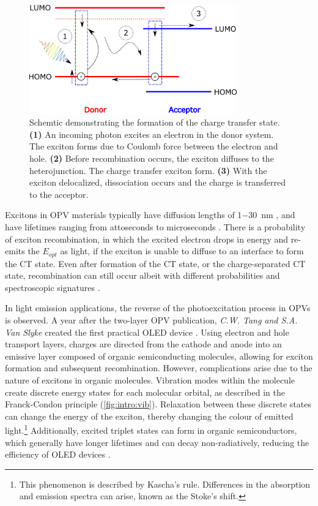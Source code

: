 \begin{figure}[h]
    \centering
    \includegraphics[width=0.8\textwidth]{pictures/CT_energy.png}
    \caption{Schemtic demonstrating the formation of the charge transfer state. \textbf{(1)} An incoming photon excites an electron in the donor system. The exciton forms due to Coulomb force between the electron and hole. \textbf{(2)} Before recombination occurs, the exciton diffuses to the heterojunction. The charge transfer exciton form. \textbf{(3)} With the exciton delocalized, dissociation occurs and the charge is transferred to the acceptor.}
    \label{fig:intro:ct}
\end{figure}

Excitons in \ac{OPV} materials typically have diffusion lengths of 1\SI{-30}{nm} \citep{proctor2013charge}, and have lifetimes ranging from attoseconds to microseconds \citep{tamai2015exciton}. There is a probability of exciton recombination, in which the excited electron drops in energy and re-emits the $E_{opt}$ as light, if the exciton is unable to diffuse to an interface to form the \ac{CT} state. Even after formation of the \ac{CT} state, or the charge-separated \ac{CT} state, recombination can still occur albeit with different probabilities and spectroscopic signatures \citep{deibel2010role}.

In light emission applications, the reverse of the photoexcitation process in \acp{OPV} is observed. A year after the two-layer \ac{OPV} publication, \emph{C.W. Tang and S.A. Van Slyke} created the first practical \ac{OLED} device \citep{Tang1987}. Using electron and hole transport layers, charges are directed from the cathode and anode into an emissive layer composed of organic semiconducting molecules, allowing for exciton formation and subsequent recombination. However, complications arise due to the nature of excitons in organic molecules. Vibration modes within the molecule create discrete energy states for each molecular orbital, as described in the Franck-Condon principle (\autoref{fig:intro:vib}). Relaxation between these discrete states can change the energy of the exciton, thereby changing the colour of emitted light.\footnote{This phenomenon is described by Kascha's rule. Differences in the absorption and emission spectra can arise, known as the Stoke's shift.} Additionally, excited triplet states can form in organic semiconductors, which generally have longer lifetimes and can decay non-radiatively, reducing the efficiency of \ac{OLED} devices \citep{kohler2009triplet}. 

